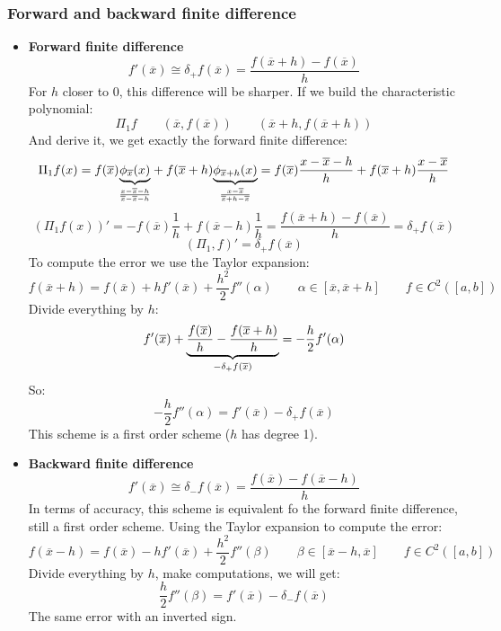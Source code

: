\subsubsection{Forward and backward finite difference}
\begin{itemize}
    \item \textbf{Forward finite difference}
    $$
    f'(\overline{x})\cong \delta_+f(\overline{x})=
    \frac{
        f(\overline{x}+h)-f(\overline{x})
    }{h}
    $$
    For $h$ closer to 0, this difference will be sharper. If we build the characteristic polynomial:
    $$
    \Pi_1f\qquad(\overline{x}, f(\overline{x}))\qquad(\overline{x}+h,f(\overline{x}+h))
    $$
    And derive it, we get exactly the forward finite difference:
    $$
    \Pi_1f(x)=f(\overline{x})
    \underlabel{
        \phi_{\overline{x}}(x)
    }{$\frac{x-\overline{x}-h}{\overline{x}-\overline{x}-h}$}
    +
    f(\overline{x}+h)
    \underlabel{
        \phi_{\overline{x}+h}(x)
    }{$\frac{x-\overline{x}}{\overline{x}+h-\overline{x}}$}=
    f(\overline{x})\frac{x-\overline{x}-h}{h}+f(\overline{x}+h)\frac{x-\overline{x}}{h}
    $$
    $$
    (\Pi_1f(x))'=-f(\overline{x})\frac{1}{h}+f(\overline{x}-h)\frac{1}{h}=
    \frac{f(\overline{x}+h)-f(\overline{x})}{h}=\delta_+f(\overline{x})
    $$
    $$
    \left(\Pi_1,f\right)'=\delta_+f(\overline{x})
    $$
    To compute the error we use the Taylor expansion:
    $$
    f(\overline{x}+h)=f(\overline{x})+hf'(\overline{x})+\frac{h^2}{2}f''(\alpha)\qquad\alpha\in [\overline{x},\overline{x}+h]\qquad f\in C^2([a,b])
    $$
    Divide everything by $h$:
    $$
    f'(\overline{x})+
    \underlabel{
        \frac{f(\overline{x})}{h}-\frac{f(\overline{x}+h)}{h}
    }{$-\delta_+f(\overline{x})$}
    =
    -\frac{h}{2}f'(\alpha)
    $$
    So:
    $$
    -\frac{h}{2}f''(\alpha)=f'(\overline{x})-\delta_+f(\overline{x})
    $$
    This scheme is a first order scheme ($h$ has degree 1).
    \item \textbf{Backward finite difference}
    $$
    f'(\overline{x})\cong \delta_-f(\overline{x})=
    \frac{
        f(\overline{x})-f(\overline{x}-h)
    }{h}
    $$
    In terms of accuracy, this scheme is equivalent fo the forward finite difference, still a first order scheme. Using the Taylor expansion to compute the error:
    $$
    f(\overline{x}-h)=f(\overline{x})-hf'(\overline{x})+\frac{h^2}{2}f''(\beta)\qquad\beta\in [\overline{x}-h,\overline{x}]\qquad f\in C^2([a,b])
    $$
    Divide everything by $h$, make computations, we will get:
    $$
    \frac{h}{2}f''(\beta)=f'(\overline{x})-\delta_-f(\overline{x})
    $$
    The same error with an inverted sign.
\end{itemize}

